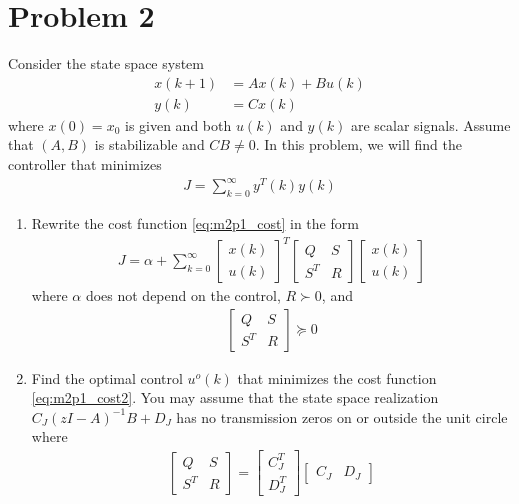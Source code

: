 \section*{Problem 2}

Consider the state space system
\begin{align*}
    x(k+1) & = Ax(k) + Bu(k) \\
    y(k) & = Cx(k)
\end{align*}
where $x(0) = x_0$ is given and both $u(k)$ and $y(k)$ are scalar signals. Assume that $(A,B)$ is stabilizable and $CB \neq 0$. In this problem, we will find the controller that minimizes
\begin{align}
    J = \sum_{k=0}^\infty y^T(k) y(k)
    \label{eq:m2p1_cost}
\end{align}

\begin{enumerate}
    \item
    Rewrite the cost function \eqref{eq:m2p1_cost} in the form
    \begin{align}
        J = \alpha + \sum_{k=0}^\infty \begin{bmatrix}
                x(k) \\
                u(k)
            \end{bmatrix}^T \begin{bmatrix}
                Q & S \\
                S^T & R
            \end{bmatrix} \begin{bmatrix}
                x(k) \\
                u(k)
            \end{bmatrix}
            \label{eq:m2p1_cost2}
    \end{align}
    where $\alpha$ does not depend on the control, $R \succ 0$, and
    \begin{align*}
        \begin{bmatrix}
                Q & S \\
                S^T & R
            \end{bmatrix} \succeq 0
    \end{align*}

    \item
    Find the optimal control $u^o(k)$ that minimizes the cost function \eqref{eq:m2p1_cost2}. You may assume that the state space realization $C_J (zI-A)^{-1}B + D_J$ has no transmission zeros on or outside the unit circle where
    \begin{align*}
        \begin{bmatrix}
                Q & S \\
                S^T & R
            \end{bmatrix} = \begin{bmatrix}
                C_J^T \\
                D_J^T
            \end{bmatrix} \begin{bmatrix}
                C_J & D_J
            \end{bmatrix}
    \end{align*}


\end{enumerate}
